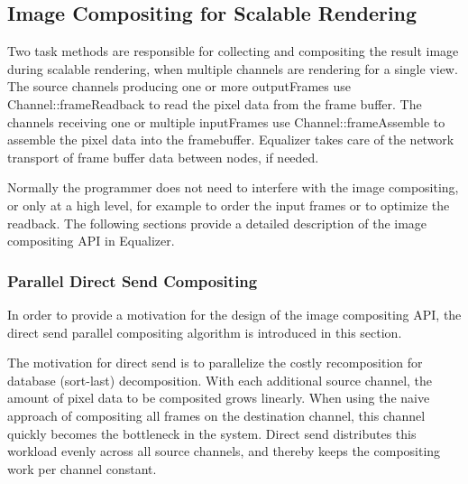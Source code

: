 \documentclass[10pt,a4]{scrartcl}
\begin{document}
\subsection{\label{sCompositing}Image Compositing for Scalable Rendering}

Two task methods are responsible for collecting and compositing the
result image during scalable rendering, when multiple channels are
rendering for a single view. The source channels producing one or more
\textsf{outputFrame}s use \textsf{Channel::frameReadback} to read the
pixel data from the frame buffer. The channels receiving one or multiple
\textsf{inputFrame}s use \textsf{Channel::frameAssemb\-le} to assemble
the pixel data into the framebuffer. Equalizer takes care of the network
transport of frame buffer data between nodes, if needed.

Normally the programmer does not need to interfere with the image
compositing, or only at a high level, for example to order the input
frames or to optimize the readback. The following sections provide a
detailed description of the image compositing API in Equalizer.

\subsubsection{Parallel Direct Send Compositing}

In order to provide a motivation for the design of the image compositing
API, the direct send parallel compositing algorithm is introduced in this
section.

The motivation for direct send is to parallelize the costly
recomposition for database (sort-last) decomposition. With each
additional source channel, the amount of pixel data to be composited
grows linearly. When using the naive approach of compositing all frames
on the destination channel, this channel quickly becomes the bottleneck
in the system. Direct send distributes this workload evenly across all
source channels, and thereby keeps the compositing work per channel
constant.
\end{document}
